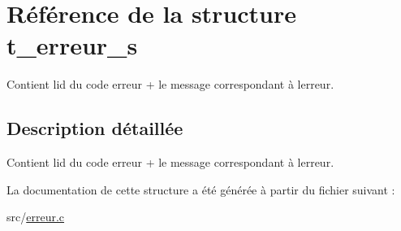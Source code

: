 \hypertarget{structt__erreur__s}{}\section{Référence de la structure t\+\_\+erreur\+\_\+s}
\label{structt__erreur__s}


Contient l\textquotesingle{}id du code erreur + le message correspondant à l\textquotesingle{}erreur.  




\subsection{Description détaillée}
Contient l\textquotesingle{}id du code erreur + le message correspondant à l\textquotesingle{}erreur. 

La documentation de cette structure a été générée à partir du fichier suivant \+:\begin{DoxyCompactItemize}
\item 
src/\hyperlink{erreur_8c}{erreur.\+c}\end{DoxyCompactItemize}

